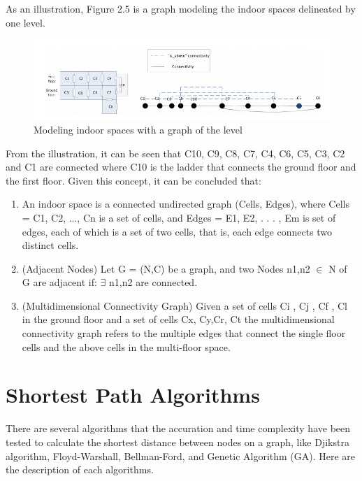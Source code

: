 As an illustration, Figure 2.5 is a graph modeling the indoor spaces delineated by one level.

\begin{figure}[h!]
	\centering
	\includegraphics[scale=0.6]{figure5a.png}
	\caption{Modeling indoor spaces with a graph of the level }
	\label{fig:figure5}
\end{figure}

From the illustration, it can be seen that C10, C9, C8, C7, C4, C6, C5, C3, C2 and C1 are connected where C10 is the ladder that connects the ground floor and the first floor. Given this concept, it can be concluded that:
\begin{enumerate}
	\item An indoor space is a connected undirected graph (Cells, Edges), where Cells = {C1, C2, ..., Cn} is a set of cells, and Edges = {E1, E2, . . . , Em} is set of edges, each of which is a set of two cells, that is, each edge connects two distinct cells. 
	\item (Adjacent Nodes) Let G = (N,C) be a graph, and two Nodes n1,n2 $\in$ N of G are adjacent if: $\exists$ n1,n2 are connected.
	\item (Multidimensional Connectivity Graph) Given a set of cells Ci , Cj , Cf , Cl in the ground floor and a set of cells Cx, Cy,Cr, Ct the multidimensional connectivity graph refers to the multiple edges that connect the single floor cells and the above cells in the multi-floor space\cite{alamri2014adjacency}.
\end{enumerate}	 

\section{Shortest Path Algorithms}
There are several algorithms that the accuration and time complexity have been tested to calculate the shortest distance between nodes on a graph, like Djikstra algorithm, Floyd-Warshall, Bellman-Ford, and Genetic Algorithm (GA). Here are the description of each algorithms.

